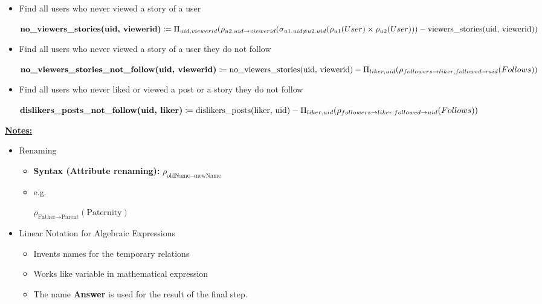 \documentclass[12pt]{article}
\begin{document}
\begin{enumerate}[1.]
\begin{itemize}
        \item Find all users who never viewed a story of a user

        \begin{mdframed}
        $\textbf{no\_viewers\_stories(uid, viewerid)} \coloneqq \Pi_{uid, viewerid}(\rho_{u2.uid \to viewerid}(\sigma_{u1.uid \neq u2.uid}(\\\rho_{u1}(User) \times \rho_{u2}(User))) - \text{viewers\_stories(uid, viewerid)})$
        \end{mdframed}

        \item Find all users who never viewed a story of a user they do not follow

        \begin{mdframed}
        $\textbf{no\_viewers\_stories\_not\_follow(uid, viewerid)} \coloneqq \\\text{no\_viewers\_stories(uid, viewerid)} \\- \Pi_{liker, uid}(\rho_{followers \to liker, followed \to uid}(Follows))$
        \end{mdframed}

        \item Find all users who never liked or viewed a post or a story they
        do not follow

        \begin{mdframed}
        $\textbf{dislikers\_posts\_not\_follow(uid, liker)} \coloneqq \text{dislikers\_posts(liker, uid)} -\\ \Pi_{liker, uid}(\rho_{followers \to liker, followed \to uid}(Follows))$
        \end{mdframed}
    \end{itemize}

    \bigskip

    \underline{\textbf{Notes:}}

    \bigskip

    \begin{itemize}
        \item Renaming
        \begin{itemize}
            \item \textbf{Syntax (Attribute renaming):} $\rho_{\text{oldName} \to \text{newName}}$
            \item e.g.

            \bigskip

            $\rho_{\text{Father} \to \text{Parent}}(\text{Paternity})$
        \end{itemize}
        \item Linear Notation for Algebraic Expressions
        \begin{itemize}
            \item Invents names for the temporary relations
            \item Works like variable in mathematical expression
            \item The name \textbf{Answer} is used for the result of the final step.


\end{itemize}
\end{itemize}
\end{enumerate}
\end{document}
